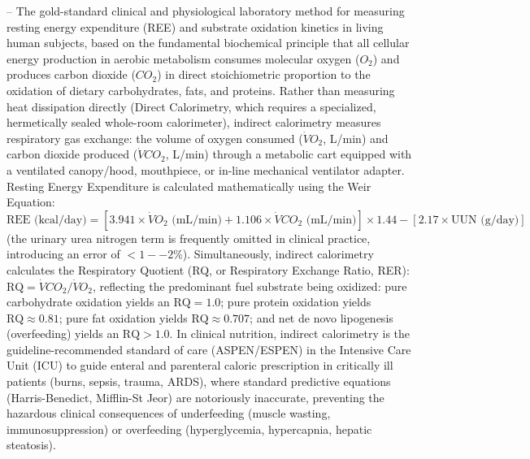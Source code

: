-- The gold-standard clinical and physiological laboratory method for measuring resting energy expenditure (REE) and substrate oxidation kinetics in living human subjects, based on the fundamental biochemical principle that all cellular energy production in aerobic metabolism consumes molecular oxygen ($O_2$) and produces carbon dioxide ($CO_2$) in direct stoichiometric proportion to the oxidation of dietary carbohydrates, fats, and proteins. Rather than measuring heat dissipation directly (Direct Calorimetry, which requires a specialized, hermetically sealed whole-room calorimeter), indirect calorimetry measures respiratory gas exchange: the volume of oxygen consumed ($\dot{V}O_2$, L/min) and carbon dioxide produced ($\dot{V}CO_2$, L/min) through a metabolic cart equipped with a ventilated canopy/hood, mouthpiece, or in-line mechanical ventilator adapter. Resting Energy Expenditure is calculated mathematically using the Weir Equation: $\text{REE (kcal/day)} = [3.941 \times \dot{V}O_2\text{ (mL/min)} + 1.106 \times \dot{V}CO_2\text{ (mL/min)}] \times 1.44 - [2.17 \times \text{UUN (g/day)}]$ (the urinary urea nitrogen term is frequently omitted in clinical practice, introducing an error of $<1--2\%$). Simultaneously, indirect calorimetry calculates the Respiratory Quotient (RQ, or Respiratory Exchange Ratio, RER): $\text{RQ} = \dot{V}CO_2 / \dot{V}O_2$, reflecting the predominant fuel substrate being oxidized: pure carbohydrate oxidation yields an $\text{RQ} = 1.0$; pure protein oxidation yields $\text{RQ} \approx 0.81$; pure fat oxidation yields $\text{RQ} \approx 0.707$; and net de novo lipogenesis (overfeeding) yields an $\text{RQ} > 1.0$. In clinical nutrition, indirect calorimetry is the guideline-recommended standard of care (ASPEN/ESPEN) in the Intensive Care Unit (ICU) to guide enteral and parenteral caloric prescription in critically ill patients (burns, sepsis, trauma, ARDS), where standard predictive equations (Harris-Benedict, Mifflin-St Jeor) are notoriously inaccurate, preventing the hazardous clinical consequences of underfeeding (muscle wasting, immunosuppression) or overfeeding (hyperglycemia, hypercapnia, hepatic steatosis).


